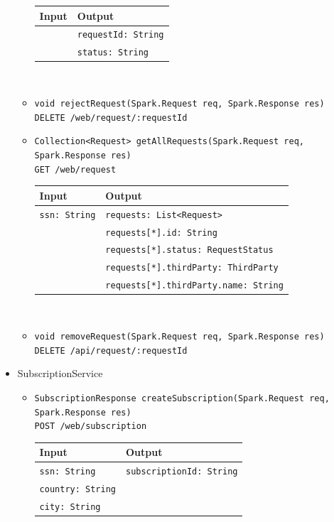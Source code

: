 \documentclass[a4paper, hidelinks, 12pt]{report}
\begin{document}
\begin{itemize}
\begin{itemize}
			\begin{tabular}{l | l}
			\textbf{Input} & \textbf{Output} \\
			\hline
				& \verb|requestId: String| \\
				& \verb|status: String|\\
			\end{tabular}\\
			\item{\verb|void rejectRequest(Spark.Request req, Spark.Response res)|\\ \verb|DELETE /web/request/:requestId|}
			\item{\verb|Collection<Request> getAllRequests(Spark.Request req,|\\ \verb|Spark.Response res)|\\ \verb|GET /web/request|}\\
			\begin{tabular}{l | l}
			\textbf{Input} & \textbf{Output} \\
			\hline
				\verb|ssn: String| & \verb|requests: List<Request>| \\
				& \verb|requests[*].id: String| \\
				& \verb|requests[*].status: RequestStatus| \\
				& \verb|requests[*].thirdParty: ThirdParty| \\
				& \verb|requests[*].thirdParty.name: String| \\
			\end{tabular}\\
			\item{\verb|void removeRequest(Spark.Request req, Spark.Response res)|\\ \verb|DELETE /api/request/:requestId|}
		\end{itemize}
		\item{SubscriptionService}
		\begin{itemize}
			\item{\verb|SubscriptionResponse createSubscription(Spark.Request req,|\\ \verb|Spark.Response res)|\\ \verb|POST /web/subscription|}\\
			\begin{tabular}{l | l}
			\textbf{Input} & \textbf{Output} \\
			\hline
				\verb|ssn: String| & \verb|subscriptionId: String| \\
				\verb|country: String| & \\
				\verb|city: String| & \\

\end{tabular}
\end{itemize}
\end{itemize}
\end{document}
